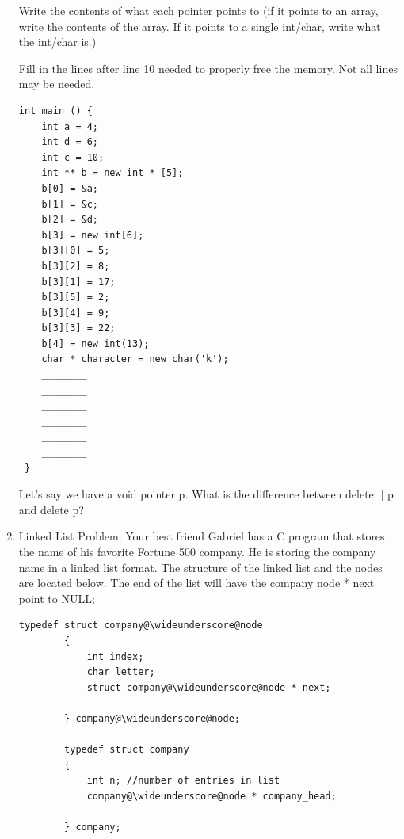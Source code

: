 \documentclass{article}
\newcommand{\wideunderscore}{\underline{\hphantom{n}}}
\begin{document}
\begin{enumerate}[label=(\alph*), itemsep = 120pt]
\begin{lstlisting}[style=CStyle]
    \end{lstlisting}

    Write the contents of what each pointer points to (if it points to an array, write the contents of the array. If it points to a single int/char, write what the int/char is.) \newline \newline \newline \newline \newline 


Fill in the lines after line 10 needed to properly free the memory. Not all lines may be needed.

    \begin{lstlisting}[style=CStyle]
int main () {
    int a = 4;
    int d = 6;
    int c = 10;
    int ** b = new int * [5];  
    b[0] = &a;
    b[1] = &c;   
    b[2] = &d;
    b[3] = new int[6];
    b[3][0] = 5;
    b[3][2] = 8;
    b[3][1] = 17;
    b[3][5] = 2;
    b[3][4] = 9;
    b[3][3] = 22; 
    b[4] = new int(13);
    char * character = new char('k');
    ________
    ________
    ________
    ________
    ________
    ________
 }

    \end{lstlisting}

    Let’s say we have a void pointer p. What is the difference between delete [] p and delete p?



    \item Linked List Problem:
    Your best friend Gabriel has a C program that stores the name of his favorite Fortune 500 company. He is storing the company name in a linked list format. The structure of the linked list and the nodes are located below. The end of the list will have the company \wideunderscore node * next point to NULL;

    \begin{lstlisting}[style = CStyle]
        typedef struct company@\wideunderscore@node
        {
            int index;
            char letter;
            struct company@\wideunderscore@node * next;
            
        } company@\wideunderscore@node;

        typedef struct company
        {
            int n; //number of entries in list
            company@\wideunderscore@node * company_head;
            
        } company;
    \end{lstlisting}


\end{enumerate}
\end{document}
